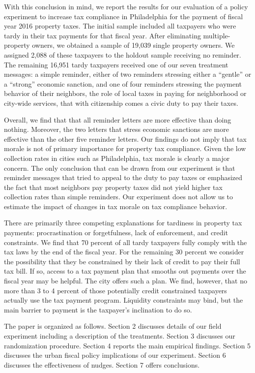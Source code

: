 \documentclass[12pt]{article}
\begin{document}
With this conclusion in mind, we report the results for our evaluation
of a policy experiment to increase tax compliance in Philadelphia for
the payment of fiscal year 2016 property taxes.  The initial sample
included all taxpayers who were tardy in their tax payments for that
fiscal year.  After eliminating multiple-property owners, we obtained
a sample of 19,039 single property owners. We assigned 2,088 of these
taxpayers to the holdout sample receiving no reminder.  The remaining
16,951 tardy taxpayers received one of our seven treatment messages: a
simple reminder, either of two reminders stressing either a ``gentle''
or a ``strong'' economic sanction, and one of four reminders stressing
the payment behavior of their neighbors, the role of local taxes in
paying for neighborhood or city-wide services, that with citizenship
comes a civic duty to pay their taxes.

Overall, we find that that all reminder letters are more effective
than doing nothing.  Moreover, the two letters that stress economic
sanctions are more effective than the other five reminder letters. Our
findings do not imply that tax morale is not of primary importance for
property tax compliance. Given the low collection rates in cities such
as Philadelphia, tax morale is clearly a major concern. The only
conclusion that can be drawn from our experiment is that reminder
messages that tried to appeal to the duty to pay taxes or emphasized
the fact that most neighbors pay property taxes did not yield higher
tax collection rates than simple reminders. Our experiment does not
allow us to estimate the impact of changes in tax morale on tax
compliance behavior.

There are primarily three competing explanations for tardiness in
property tax payments: procrastination or forgetfulness, lack of
enforcement, and credit constraints. We find that 70 percent of all
tardy taxpayers fully comply with the tax laws by the end of the
fiscal year.  For the remaining 30 percent we consider the possibility
that they be constrained by their lack of credit to pay their full tax
bill.  If so, access to a tax payment plan that smooths out payments
over the fiscal year may be helpful.  The city offers such a plan.  We
find, however, that no more than 3 to 4 percent of those potentially
credit constrained taxpayers actually use the tax payment program.
Liquidity constraints may bind, but the main barrier to payment is the
taxpayer's inclination to do so.

The paper is organized as follows. Section 2 discusses details of our
field experiment including a description of the treatments. Section 3
discusses our randomization procedure.  Section 4 reports the main
empirical findings. Section 5 discusses the urban fiscal policy implications of our
experiment. Section 6 discusses the effectiveness of nudges. Section 7
offers conclusions.
\end{document}
